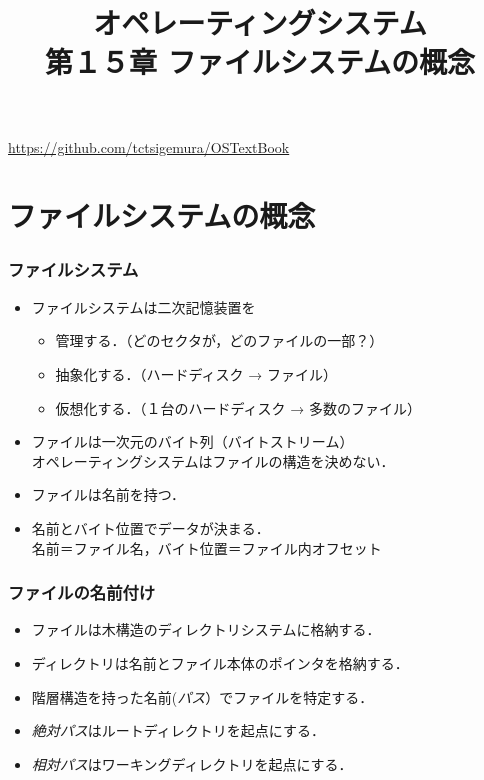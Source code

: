 \documentclass{beamer}                   %
\begin{document}
\title[ファイルシステムの概念]
      {オペレーティングシステム\\第１５章 ファイルシステムの概念}
\date{}
\begin{frame}
  \titlepage
  \centerline{\url{https://github.com/tctsigemura/OSTextBook}}
\end{frame}


\section{ファイルシステムの概念}
\begin{frame}
  \frametitle{ファイルシステム}
  \begin{itemize}
  \item ファイルシステムは二次記憶装置を
    \begin{itemize}
    \item 管理する．（どのセクタが，どのファイルの一部？）
    \item 抽象化する．（ハードディスク → ファイル）
    \item 仮想化する．（１台のハードディスク → 多数のファイル）
    \end{itemize}
  \item ファイルは一次元のバイト列（バイトストリーム） \\
    オペレーティングシステムはファイルの構造を決めない．
  \item ファイルは名前を持つ．
  \item 名前とバイト位置でデータが決まる．\\
    名前＝ファイル名，バイト位置＝ファイル内オフセット
  \end{itemize}
\end{frame}

\begin{frame}
  \frametitle{ファイルの名前付け}
  \begin{itemize}
  \item ファイルは木構造のディレクトリシステムに格納する．
  \item ディレクトリは名前とファイル本体のポインタを格納する．
  \item 階層構造を持った名前(\emph{パス}）でファイルを特定する．
  \item \emph{絶対パス}はルートディレクトリを起点にする．
  \item \emph{相対パス}はワーキングディレクトリを起点にする．
  \end{itemize}

\end{frame}
\end{document}
